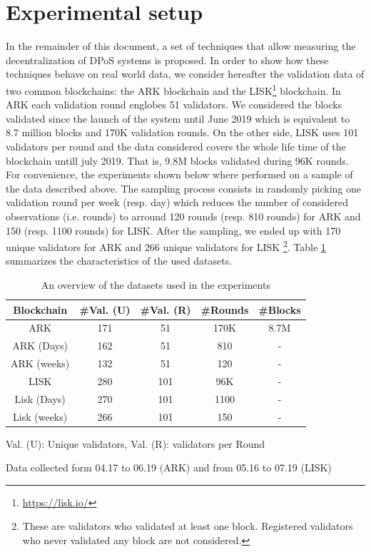 \documentclass{article}
\begin{document}
\section{Experimental setup}
In the remainder of this document, a set of techniques that allow measuring the decentralization of DPoS systems is proposed. In order to show how these techniques behave on real world data, we consider hereafter the validation data of two common blockchains: the ARK blockchain and the LISK\footnote{\url{https://lisk.io/}} blockchain. In ARK each validation round englobes 51 validators. We considered the blocks validated since the launch of the system until June 2019 which is equivalent to 8.7 million blocks and 170K validation rounds. On the other side, LISK uses 101 validators per round and the data considered covers the whole life time of the blockchain untill july 2019. That is, 9.8M blocks validated during 96K rounds. For convenience, the experiments shown below where performed on a sample of the data described above. The sampling process consists in randomly picking one validation round per week (resp. day) which reduces the number of considered observations (i.e. rounds) to arround 120 rounds (resp. 810 rounds) for ARK and 150 (resp. 1100 rounds) for LISK. After the sampling, we ended up with 170 unique validators for ARK and 266 unique validators for LISK \footnote{These are validators who validated at least one block. Registered validators who never validated any block are not considered.}. Table \ref{tab:data} summarizes the characteristics of the used datasets. 

\begin{table}[]
\centering
 \begin{threeparttable}
 \begin{tabular}{|c c c c c|} 
 \hline
 Blockchain & \#Val. (U) & \#Val. (R) & \#Rounds & \#Blocks  \\ [0.5ex] 
 \hline\hline 
 ARK & 171 & 51 & 170K & 8.7M  \\ [1ex] 
 ARK (Days)  & 162 & 51 & 810 & - \\ [1ex] 
 ARK (weeks) & 132 & 51 & 120 & - \\ [1ex] 
 LISK & 280 & 101 & 96K & - \\[1ex] 
 Lisk (Days) & 270 & 101 & 1100 & - \\ [1ex] 
 Lisk (weeks) & 266 & 101 &150 & - \\ [1ex] 
 \hline
 \end{tabular}
     \begin{tablenotes}
     \centering
      \small
      \item Val. (U): Unique validators, Val. (R): validators per Round
      \item Data collected form 04.17 to 06.19 (ARK) and from 05.16 to 07.19 (LISK)
    \end{tablenotes}
 \end{threeparttable}
 \caption{An overview of the datasets used in the experiments}
 \label{tab:data}
\end{table}
\end{document}
